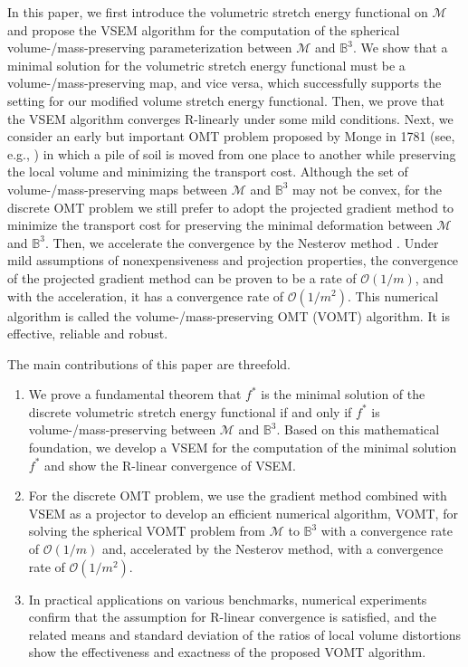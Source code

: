 \documentclass[onefignum,onetabnum]{siamonline220329}
\numberwithin{equation}{section}
\begin{document}
\begin{sloppypar}
In this paper, we first introduce the volumetric stretch energy functional on $\mathcal{M}$ and propose the VSEM algorithm for the computation of the spherical volume-/mass-preserving parameterization between $\mathcal{M}$ and $\mathbb{B}^3$. 
We show that a minimal solution for the volumetric stretch energy functional must be a volume-/mass-preserving map, and vice versa, which successfully supports the setting for our modified volume stretch energy functional. Then, we prove that the VSEM algorithm converges R-linearly under some mild conditions. Next, we consider an early but important OMT problem proposed by Monge in 1781 (see, e.g., \cite{bonnotte2013}) in which a pile of soil is moved from one place to another while preserving the local volume and minimizing the transport cost. Although the set of volume-/mass-preserving maps between $\mathcal{M}$ and $\mathbb{B}^3$ may not be convex, for the discrete OMT problem we still prefer to adopt the projected gradient method to minimize the transport cost for preserving the minimal deformation between $\mathcal{M}$ and $\mathbb{B}^3$. Then, we accelerate the convergence by the Nesterov method \cite{nesterov1983}.
Under mild assumptions of nonexpensiveness and projection properties, the convergence of the projected gradient method can be proven to be a rate of $\mathcal{O}(1/m)$, and with the acceleration, it has a convergence rate of $\mathcal{O}(1/m^2)$.
This numerical algorithm is called the volume-/mass-preserving OMT (VOMT) algorithm. It is effective, reliable and robust.

The main contributions of this paper are threefold.
\begin{enumerate}
\item We prove a fundamental theorem that $f^*$  is the minimal solution of the discrete volumetric stretch energy functional if and only if $f^*$ is volume-/mass-preserving between $\mathcal{M}$ and $\mathbb{B}^3$. Based on this mathematical foundation, we develop a VSEM for the computation of the minimal solution $f^*$ and show the R-linear convergence of VSEM.
\item For the discrete OMT problem, we use the gradient method combined with VSEM as a projector to develop an efficient numerical algorithm, VOMT, for solving the spherical VOMT problem from $\mathcal{M}$ to $\mathbb{B}^3$ with a convergence rate of $\mathcal{O}(1/m)$ and, accelerated by the Nesterov method, with a convergence rate of $\mathcal{O}(1/m^2)$.
\item In practical applications on various benchmarks, numerical experiments confirm that the assumption for R-linear convergence is satisfied, and the related means and standard deviation of the ratios of local volume distortions show the effectiveness and exactness of the proposed VOMT algorithm.
\end{enumerate}


\end{sloppypar}
\end{document}
